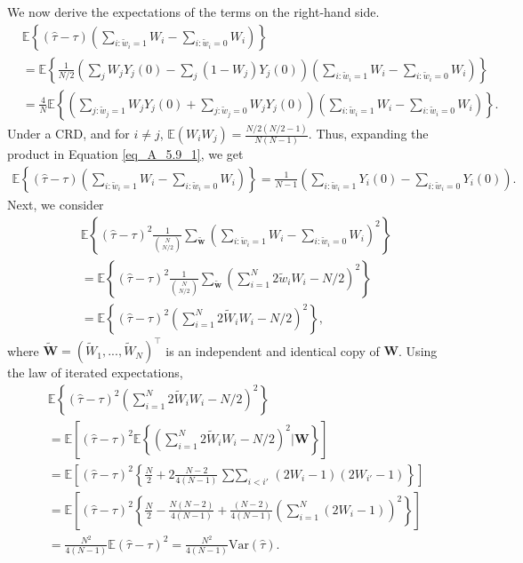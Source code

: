 \documentclass[12pt]{article}
\newcommand{\Var}{{\text{Var}}}
\newcommand{\E}{{\mathbb{E}}}
\begin{document}
We now derive the expectations of the terms on the right-hand side.
\begin{align}
&    \E\left\{(\hat{\tau} - \tau)\left(\sum_{i:\tilde{w}_i = 1}W_i  - \sum_{i:\tilde{w}_i = 0}W_i\right) \right\} \nonumber\\
& = \E\left\{\frac{1}{N/2}\left(\sum_{j}W_jY_j(0) - \sum_{j}(1-W_j)Y_j(0)\right)\left(\sum_{i:\tilde{w}_i = 1}W_i  - \sum_{i:\tilde{w}_i = 0}W_i\right) \right\} \nonumber\\
& = \frac{4}{N}\E\left\{\left(\sum_{j:\tilde{w}_j = 1}W_jY_j(0) + \sum_{j:\tilde{w}_j = 0}W_jY_j(0) \right)\left(\sum_{i:\tilde{w}_i = 1}W_i  - \sum_{i:\tilde{w}_i = 0}W_i\right) \right\}. \label{eq_A_5.9_1}
\end{align}
Under a CRD, and for $i \neq j$, $\E(W_iW_j) = \frac{N/2(N/2-1)}{N(N-1)}$. Thus, expanding the product in Equation \ref{eq_A_5.9_1}, we get
\begin{align}
     \E\left\{(\hat{\tau} - \tau)\left(\sum_{i:\tilde{w}_i = 1}W_i  - \sum_{i:\tilde{w}_i = 0}W_i\right) \right\} = \frac{1}{N-1}\left( \sum_{i:\tilde{w}_i = 1}Y_i(0)  - \sum_{i:\tilde{w}_i = 0}Y_i(0)\right).
\end{align}
Next, we consider
\begin{align}
 & \E\left\{(\hat{\tau} - \tau)^2\frac{1}{\binom{N}{N/2}}\sum_{\tilde{\bm{w}}}\left(\sum_{i:\tilde{w}_i = 1}W_i  - \sum_{i:\tilde{w}_i = 0}W_i\right)^2 \right\} \nonumber\\
  & = \E\left\{(\hat{\tau} - \tau)^2\frac{1}{\binom{N}{N/2}}\sum_{\tilde{\bm{w}}}\left(\sum_{i=1}^{N}2\tilde{w}_iW_i  - N/2\right)^2 \right\} \nonumber\\
  & = \E\left\{(\hat{\tau} - \tau)^2 \left(\sum_{i=1}^{N}2\tilde{W}_iW_i  - N/2\right)^2 \right\},
\end{align}
where $\tilde{\bm{W}} = (\tilde{W}_1,...,\tilde{W}_N)^\top$ is an independent and identical copy of $\bm{W}$. Using the law of iterated expectations,
\begin{align}
&    \E\left\{(\hat{\tau} - \tau)^2 \left(\sum_{i=1}^{N}2\tilde{W}_iW_i  - N/2\right)^2 \right\} \nonumber\\
& = \E\left[(\hat{\tau} - \tau)^2 \E\left\{\left(\sum_{i=1}^{N}2\tilde{W}_iW_i  - N/2\right)^2\Bigg|\bm{W} \right\}\right] \nonumber\\
& = \E\left[ (\hat{\tau} - \tau)^2 \left\{\frac{N}{2} + 2\frac{N-2}{4(N-1)}\mathop{\sum\sum}_{i<i'}(2W_i-1)(2W_{i'}-1) \right\}  \right] \nonumber\\
& = \E\left[ (\hat{\tau} - \tau)^2 \left\{ \frac{N}{2} - \frac{N(N-2)}{4(N-1)} + \frac{(N-2)}{4(N-1)} \left(\sum_{i=1}^{N}(2W_i-1)\right)^2 \right\}  \right] \nonumber\\
& = \frac{N^2}{4(N-1)} \E(\hat{\tau} - \tau)^2 =  \frac{N^2}{4(N-1)} \Var(\hat{\tau}).
\end{align}
\end{document}

